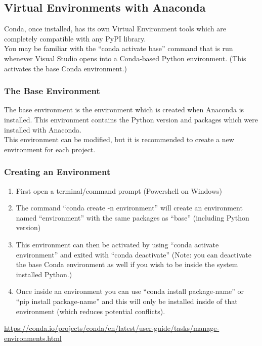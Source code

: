\documentclass[12pt]{article}
\begin{document}
        \subsection{Virtual Environments with Anaconda}
            Conda, once installed, has its own Virtual Environment tools which are completely compatible with any PyPI library.
            \\You may be familiar with the ``conda activate base'' command that is run whenever Visual Studio opens into a Conda-based Python environment.
            (This activates the base Conda environment.)
            \subsubsection{The Base Environment}
                The base environment is the environment which is created when Anaconda is installed.
                This environment contains the Python version and packages which were installed with Anaconda.
                \\This environment can be modified, but it is recommended to create a new environment for each project.
            \subsubsection{Creating an Environment}
                \begin{enumerate}
                    \item First open a terminal/command prompt (Powershell on Windows)
                    \item The command ``conda create -n environment'' will create an environment named ``environment'' with the same packages as ``base''  (including Python version)
                    \item This environment can then be activated by using ``conda activate environment'' and exited with ``conda deactivate'' (Note: you can deactivate the base Conda environment as well if you wish to be inside the system installed Python.)
                    \item Once inside an environment you can use “conda install \textlangle package-name\textrangle” or “pip install \textlangle package-name\textrangle” and this will only be installed inside of that environment (which reduces potential conflicts).
                \end{enumerate}
                \url{https://conda.io/projects/conda/en/latest/user-guide/tasks/manage-environments.html}
\end{document}
